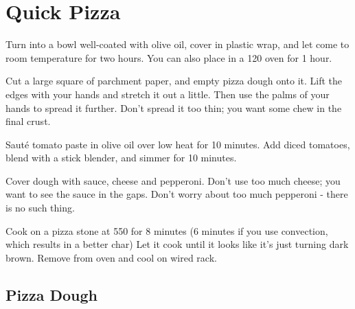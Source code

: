 \section{Quick Pizza}
\begin{recipe}



Turn into a bowl well-coated with olive oil, cover in plastic wrap, and let
come to room temperature for two hours. You can also place in a 120\degree{} oven
for 1 hour.

Cut a large square of parchment paper, and empty pizza dough onto it. Lift the
edges with your hands and stretch it out a little. Then use the palms of your
hands to spread it further. Don't spread it too thin; you want some chew in
the final crust.


Sauté tomato paste in olive oil over low heat for 10 minutes. Add
diced tomatoes, blend with a stick blender, and simmer for 10 minutes.


Cover dough with sauce, cheese and pepperoni. Don't use too much cheese; you want
to see the sauce in the gaps. Don't worry about too much pepperoni - there is no
such thing.

Cook on a pizza stone at 550\degree{} for 8 minutes
(6 minutes if you use convection, which results in a better char)
Let it cook until it looks like it's just turning dark brown. Remove from oven
and cool on wired rack.


\subsection{Pizza Dough}


\end{recipe}
